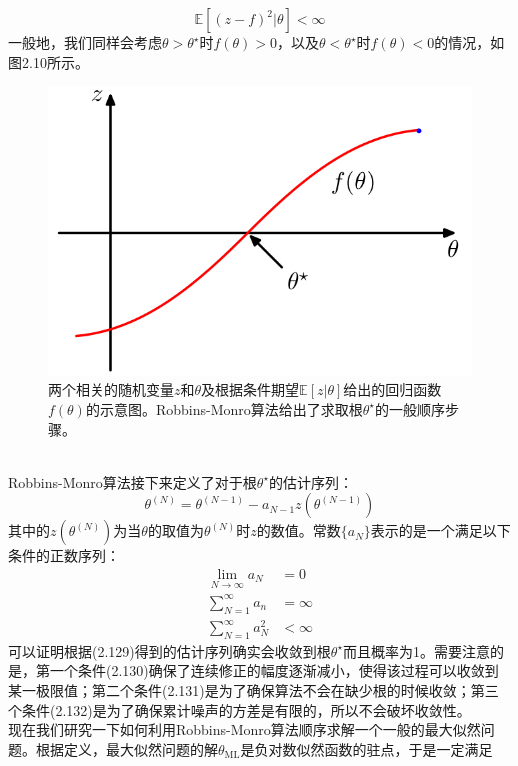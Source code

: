 \documentclass[b5paper]{book}
\numberwithin{equation}{chapter}
\begin{document}
{	\begin{equation}
		\mathbb{E}[(z-f)^2|\theta]<\infty
	\end{equation}
	一般地，我们同样会考虑$\theta>\theta^{\star}$时$f(\theta)>0$，以及$\theta<\theta^{\star}$时$f(\theta)<0$的情况，如图2.10所示。
	\begin{figure}[ht]
		\centering
		\includegraphics[scale=0.3]{Images/2-10.png}
		\caption{两个相关的随机变量$z$和$\theta$及根据条件期望$\mathbb{E}[z|\theta]$给出的回归函数$f(\theta)$的示意图。Robbins-Monro算法给出了求取根$\theta^{\star}$的一般顺序步骤。}
		\label{fig:2-10}
	\end{figure}
	\\
	\indent Robbins-Monro算法接下来定义了对于根$\theta^{\star}$的估计序列：
	\begin{equation}
		\theta^{(N)}=\theta^{(N-1)}-a_{N-1}z(\theta^{(N-1)})
	\end{equation}
	其中的$z(\theta^{(N)})$为当$\theta$的取值为$\theta^{(N)}$时$z$的数值。常数$\{a_N\}$表示的是一个满足以下条件的正数序列：
	\begin{align}
		\lim_{N \rightarrow \infty}a_N &=0 \\
		\sum_{N=1}^{\infty}a_n &=\infty \\
		\sum_{N=1}^{\infty}a_N^2 &< \infty
	\end{align}
	可以证明根据(2.129)得到的估计序列确实会收敛到根$\theta^{\star}$而且概率为1。需要注意的是，第一个条件(2.130)确保了连续修正的幅度逐渐减小，使得该过程可以收敛到某一极限值；第二个条件(2.131)是为了确保算法不会在缺少根的时候收敛；第三个条件(2.132)是为了确保累计噪声的方差是有限的，所以不会破坏收敛性。\\
	\indent 现在我们研究一下如何利用Robbins-Monro算法顺序求解一个一般的最大似然问题。根据定义，最大似然问题的解$\theta_{\mathrm{ML}}$是负对数似然函数的驻点，于是一定满足
}
\end{document}
